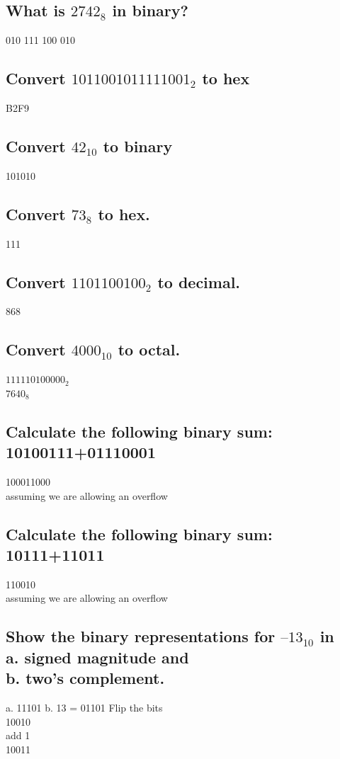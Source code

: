 \documentclass{article}
\begin{document}
\subsection{What is $2742_8$ in binary?}
010 111 100 010

\subsection{Convert $1011 0010 1111 1001_2$ to hex}
B2F9

\subsection{Convert $42_{10}$ to binary}
101010

\subsection{Convert $73_8$ to hex.}
111

\subsection{Convert $1101100100_2$ to decimal.}
868

\subsection{Convert $4000_{10}$ to octal.}
$111 110 100 000_2$\\
$7640_8$

\subsection{Calculate the following binary sum: 10100111+01110001}
100011000\\
assuming we are allowing an overflow

\subsection{Calculate the following binary sum: 10111+11011}
110010\\
assuming we are allowing an overflow

\subsection{Show the binary representations for $–13_{10}$ in\\
a. signed magnitude and\\
b. two’s complement. }
a. 11101
b. 13 = 01101
Flip the bits\\
10010\\
add 1\\
10011
\end{document}
